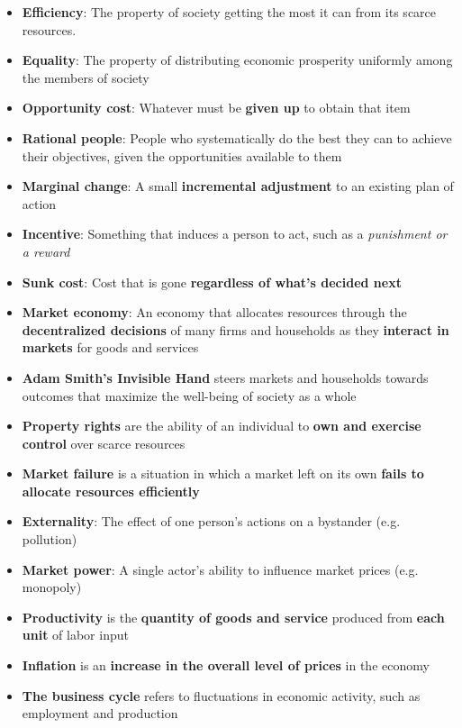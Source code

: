 \documentclass[12pt,a4paper]{article}
\begin{document}
\begin{itemize}
    \item \textbf{Efficiency}: The property of society getting the most it can from its scarce resources.
    \item \textbf{Equality}: The property of distributing economic prosperity uniformly among the members of society
    \item \textbf{Opportunity cost}: Whatever must be \textbf{given up} to obtain that item
    \item \textbf{Rational people}: People who systematically do the best they can to achieve their objectives, given the opportunities available to them
    \item \textbf{Marginal change}: A small \textbf{incremental adjustment} to an existing plan of action
    \item \textbf{Incentive}: Something that induces a person to act, such as a \textit{punishment or a reward}
    \item \textbf{Sunk cost}: Cost that is gone \textbf{regardless of what's decided next}
\end{itemize}

\begin{itemize}
    \item \textbf{Market economy}: An economy that allocates resources through the \textbf{decentralized decisions} of many firms and households as they \textbf{interact in markets} for goods and services
    \item \textbf{Adam Smith's Invisible Hand} steers markets and households towards outcomes that maximize the well-being of society as a whole
    \item \textbf{Property rights} are the ability of an individual to \textbf{own and exercise control} over scarce resources
    \item \textbf{Market failure} is a situation in which a market left on its own \textbf{fails to allocate resources efficiently}
    \item \textbf{Externality}: The effect of one person's actions on a bystander (e.g. pollution)
    \item \textbf{Market power}: A single actor's ability to influence market prices (e.g. monopoly)
\end{itemize}

\begin{itemize}
    \item \textbf{Productivity} is the \textbf{quantity of goods and service} produced from \textbf{each unit} of labor input
    \item \textbf{Inflation} is an \textbf{increase in the overall level of prices} in the economy
    \item \textbf{The business cycle} refers to fluctuations in economic activity, such as employment and production
\end{itemize}
\end{document}

